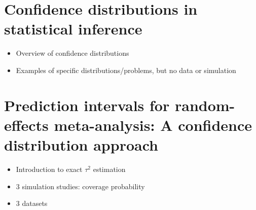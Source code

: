 \documentclass{article}
\begin{document}
\section{Confidence distributions in statistical inference}
\begin{itemize}
  \item Overview of confidence distributions
  \item Examples of specific distributions/problems, but no data or simulation
\end{itemize}

\section{Prediction intervals for random-effects meta-analysis: A confidence distribution approach}
\begin{itemize}
  \item Introduction to exact $\tau^2$ estimation
  \item 3 simulation studies: coverage probability
  \item 3 datasets
\end{itemize}
\end{document}
